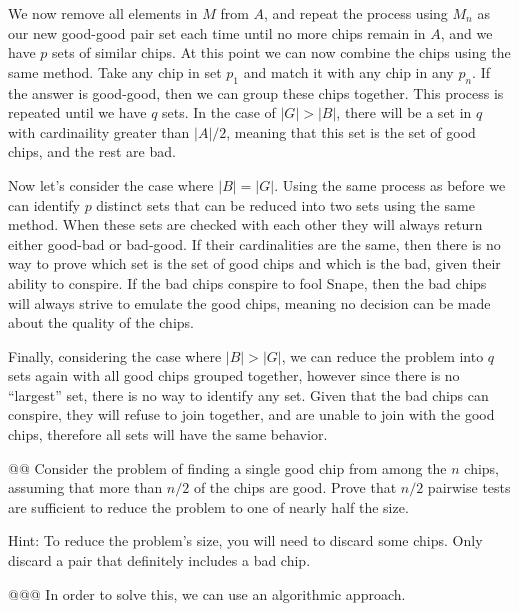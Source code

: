 \documentclass[10pt]{article}
\begin{document}
\begin{easylist}[enumerate]
        We now remove all elements in $M$ from $A$, and repeat the process using $M_n$ as our new good-good pair set each time until no more chips remain in $A$, and we have $p$ sets of similar chips. At this point we can now combine the chips using the same method. Take any chip in set $p_1$ and match it with any chip in any $p_n$. If the answer is good-good, then we can group these chips together. This process is repeated until we have $q$ sets. In the case of $|G| > |B|$, there will be a set in $q$ with cardinaility greater than $|A|/2$, meaning that this set is the set of good chips, and the rest are bad.\newline

        Now let's consider the case where $|B| = |G|$. Using the same process as before we can identify $p$ distinct sets that can be reduced into two sets using the same method. When these sets are checked with each other they will always return either good-bad or bad-good. If their cardinalities are the same, then there is no way to prove which set is the set of good chips and which is the bad, given their ability to conspire. If the bad chips conspire to fool Snape, then the bad chips will always strive to emulate the good chips, meaning no decision can be made about the quality of the chips.\newline

        Finally, considering the case where $|B| > |G|$, we can reduce the problem into $q$ sets again with all good chips grouped together, however since there is no ``largest'' set, there is no way to identify any set. Given that the bad chips can conspire, they will refuse to join together, and are unable to join with the good chips, therefore all sets will have the same behavior.

    @@ Consider the problem of finding a single good chip from among the $n$ chips, assuming that more than $n/2$ of the chips are good. Prove that $n/2$ pairwise tests are sufficient to reduce the problem to one of nearly half the size.

    Hint: To reduce the problem's size, you will need to discard some chips. Only discard a pair that definitely includes a bad chip.

    @@@ In order to solve this, we can use an algorithmic approach.


\end{easylist}
\end{document}

